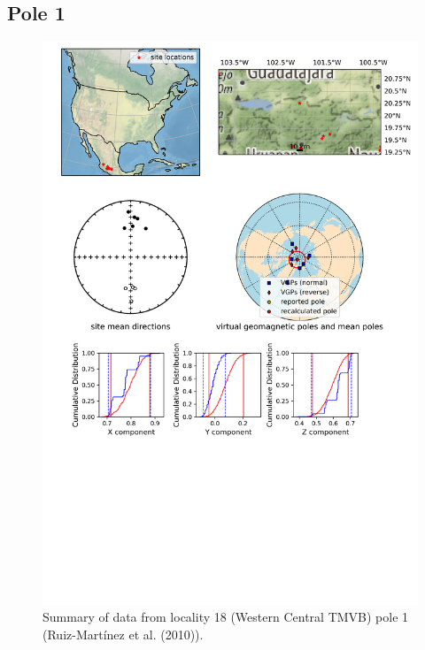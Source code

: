 \subsection{Pole 1}


\begin{figure}[H]
\centering
\includegraphics[width=5 in]{./18/1/pole_summary.png}
\caption{Summary of data from locality 18 (Western Central TMVB) pole 1 (Ruiz-Martínez et al. (2010)).}
\end{figure}


